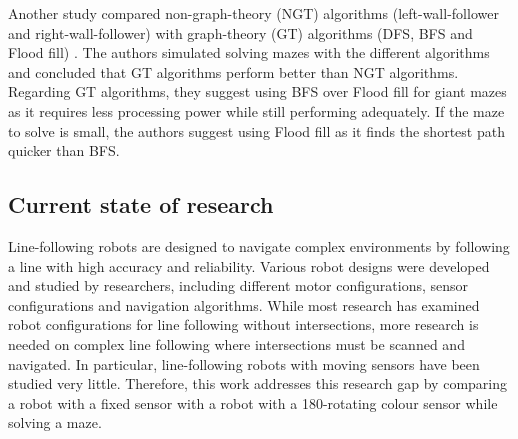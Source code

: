 Another study compared non-graph-theory (NGT) algorithms (left-wall-follower and right-wall-follower) with graph-theory (GT) algorithms (DFS, BFS and Flood fill) \cite{sadik}. The authors simulated solving mazes with the different algorithms  and concluded that GT algorithms perform better than NGT algorithms. Regarding GT algorithms, they suggest using BFS over Flood fill for giant mazes as it requires less processing power while still performing adequately. If the maze to solve is small, the authors suggest using Flood fill as it finds the shortest path quicker than BFS.

\subsection{Current state of research}

Line-following robots are designed to navigate complex environments by following a line with high accuracy and reliability. Various robot designs were developed and studied by researchers, including different motor configurations, sensor configurations and navigation algorithms. While most research has examined robot configurations for line following without intersections, more research is needed on complex line following where intersections must be scanned and navigated. In particular, line-following robots with moving sensors have been studied very little. Therefore, this work addresses this research gap by comparing a robot with a fixed sensor with a robot with a 180-rotating colour sensor while solving a maze.
